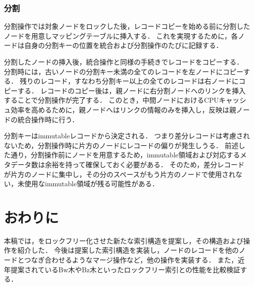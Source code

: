 \subsubsection{分割}

分割操作では対象ノードをロックした後，レコードコピーを始める前に分割したノードを用意しマッピングテーブルに挿入する．
これを実現するために，各ノードは自身の分割キーの位置を統合および分割操作のたびに記録する．

分割したノードの挿入後，統合操作と同様の手続きでレコードをコピーする．
分割時には，古いノードの分割キー未満の全てのレコードを左ノードにコピーする．
残りのレコード，すなわち分割キー以上の全てのレコードは右ノードにコピーする．
レコードのコピー後は，親ノードに右分割ノードへのリンクを挿入することで分割操作が完了する．
このとき，中間ノードにおけるCPUキャッシュ効率を高めるために，親ノードへはリンクの情報のみを挿入し，反映は親ノードの統合操作時に行う．

分割キーはimmutableレコードから決定される．
つまり差分レコードは考慮されないため，分割操作時に片方のノードにレコードの偏りが発生しうる．
前述した通り，分割操作前にノードを用意するため，immutable領域および対応するメタデータ数は余裕を持って確保しておく必要がある．
そのため，差分レコードが片方のノードに集中し，その分のスペースがもう片方のノードで使用されない，未使用なimmutable領域が残る可能性がある．

\section{おわりに}
\label{sec:conclusion}

本稿では，\Bptree{}をロックフリー化させた新たな索引構造\Bctree{}を提案し，その構造および操作を紹介した．
今後は提案した索引構造を実装し，ノードのレコードを他のノードとつなぎ合わせるようなマージ操作など，他の操作を実装する．
また，近年提案されているBw木やBz木といったロックフリー索引との性能を比較検証する．